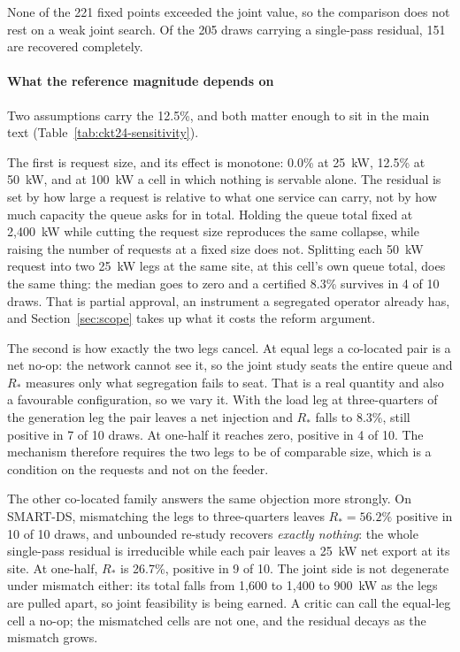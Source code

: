 \documentclass[review,authoryear,12pt]{elsarticle}
\begin{document}
None of the 221 fixed points exceeded the joint value, so the comparison does
not rest on a weak joint search. Of the 205 draws carrying a single-pass
residual, 151 are recovered completely.

\paragraph{What the reference magnitude depends on}
Two assumptions carry the 12.5\%, and both matter enough to sit in the main
text (Table~\ref{tab:ckt24-sensitivity}).

The first is request size, and its effect is monotone: 0.0\% at 25~kW, 12.5\%
at 50~kW, and at 100~kW a cell in which nothing is servable alone. The residual
is set by how large a request is relative to what one service can carry, not by
how much capacity the queue asks for in total. Holding the queue total fixed
at 2{,}400~kW while cutting the request size reproduces the same collapse,
while raising the number of requests at a fixed size does not. Splitting each
50~kW request into two 25~kW legs at the same site, at this cell's own queue
total, does the same thing: the median goes to zero and a certified 8.3\%
survives in 4 of 10 draws. That is partial approval, an instrument a segregated
operator already has, and Section~\ref{sec:scope} takes up what it costs the
reform argument.

The second is how exactly the two legs cancel. At equal legs a co-located pair
is a net no-op: the network cannot see it, so the joint study seats the entire
queue and $R_{\ast}$ measures only what segregation fails to seat. That is a
real quantity and also a favourable configuration, so we vary it. With the load
leg at three-quarters of the generation leg the pair leaves a net injection and
$R_{\ast}$ falls to 8.3\%, still positive in 7 of 10 draws. At one-half it
reaches zero, positive in 4 of 10. The mechanism therefore requires the two
legs to be of comparable size, which is a condition on the requests and not on
the feeder.

The other co-located family answers the same objection more strongly. On
SMART-DS, mismatching the legs to three-quarters leaves
$R_{\ast} = 56.2\%$ positive in 10 of 10 draws, and unbounded re-study recovers
\emph{exactly nothing}: the whole single-pass residual is irreducible while
each pair leaves a 25~kW net export at its site. At one-half, $R_{\ast}$ is
26.7\%, positive in 9 of 10. The joint side is not degenerate under mismatch
either: its total falls from 1{,}600 to 1{,}400 to 900~kW as the legs are
pulled apart, so joint feasibility is being earned. A critic can call the
equal-leg cell a no-op; the mismatched cells are not one, and the residual
decays as the mismatch grows.
\end{document}
